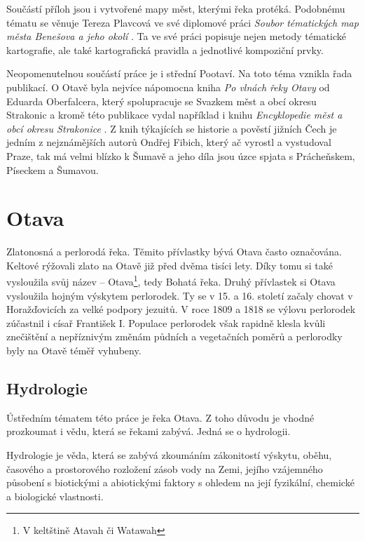 \documentclass[thesis=M,czech]{FITthesis}[2012/06/26]
\begin{document}
Součástí příloh jsou i vytvořené mapy měst, kterými řeka protéká. Podobnému tématu se věnuje Tereza Plavcová ve své diplomové práci \textit{Soubor tématických map města Benešova a jeho okolí} \cite{plavcova}. Ta ve své práci popisuje nejen metody tématické kartografie, ale také kartografická pravidla a jednotlivé kompoziční prvky.

Neopomenutelnou součástí práce je i střední Pootaví. Na toto téma vznikla řada publikací. O Otavě byla nejvíce nápomocna kniha \textit{Po vlnách řeky Otavy} \cite{SMOOS} od Eduarda Oberfalcera, který spolupracuje se Svazkem měst a obcí okresu Strakonic a kromě této publikace vydal například i knihu \textit{Encyklopedie měst a obcí okresu Strakonice} \cite{obce}. Z knih týkajících se historie a pověstí jižních Čech je jedním z nejznámějších autorů Ondřej Fibich, který ač vyrostl a vystudoval Praze, tak má velmi blízko k Šumavě a jeho díla jsou úzce spjata s Prácheňskem, Píseckem a Šumavou.










\chapter{Otava}
Zlatonosná a perlorodá řeka. Těmito přívlastky bývá Otava často označována. Keltové rýžovali zlato na Otavě již před dvěma tisíci lety. Díky tomu si také vysloužila svůj název – Otava\footnote{V keltštině Atavah či Watawah}, tedy Bohatá řeka. Druhý přívlastek si Otava vysloužila hojným výskytem perlorodek. Ty se v 15. a 16. století začaly chovat v Horažďovicích za velké podpory jezuitů. V roce 1809 a 1818 se výlovu perlorodek zúčastnil i císař František I. Populace perlorodek však rapidně klesla kvůli znečištění a nepříznivým změnám půdních a vegetačních poměrů a perlorodky byly na Otavě téměř vyhubeny. \cite{SMOOS}


\section{Hydrologie}
Ústředním tématem této práce je řeka Otava. Z toho důvodu je vhodné prozkoumat i vědu, která se řekami zabývá. Jedná se o hydrologii.


Hydrologie je věda, která se zabývá zkoumáním zákonitostí výskytu, oběhu, časového a prostorového rozložení zásob vody na Zemi, jejího vzájemného působení s biotickými a abiotickými faktory s ohledem na její fyzikální, chemické a biologické vlastnosti. 
\end{document}
